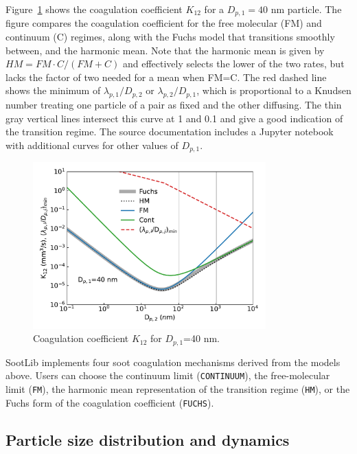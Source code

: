 \documentclass[preprint,letterpaper]{elsarticle}
\begin{document}
Figure~\ref{f:coagulation} shows the coagulation coefficient $K_12$ for a $D_{p,1}=40$ nm particle. The figure compares the coagulation coefficient for the free molecular (FM) and continuum (C) regimes, along with the Fuchs model that transitions smoothly between, and the harmonic mean. Note that the harmonic mean is given by $HM=FM\cdot C/(FM+C)$ and effectively selects the lower of the two rates, but lacks the factor of two needed for a mean when FM=C. The red dashed line shows the minimum of $\lambda_{p,1}/D_{p,2}$ or $\lambda_{p,2}/D_{p,1}$, which is proportional to a Knudsen number treating one particle of a pair as fixed and the other diffusing. The thin gray vertical lines intersect this curve at 1 and 0.1 and give a good indication of the transition regime. The source documentation includes a Jupyter notebook with additional curves for other values of $D_{p,1}$.
%
\begin{figure}
    \begin{center}
        \includegraphics[width=0.8\textwidth]{fig_coagulation.pdf}
    \end{center}
    \caption{Coagulation coefficient $K_{12}$ for $D_{p,1}$=40 nm.}
    \label{f:coagulation}
\end{figure}
%

SootLib implements four soot coagulation mechanisms derived from the models above. Users can choose the continuum limit (\texttt{CONTINUUM}), the free-molecular limit (\texttt{FM}), the harmonic mean representation of the transition regime (\texttt{HM}), or the Fuchs form of the coagulation coefficient (\texttt{FUCHS}).


\subsection{Particle size distribution and dynamics}
\label{s:PSD_dynamics}
\end{document}
